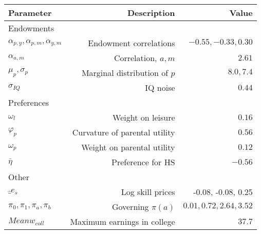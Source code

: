 \begin{tabular}{lrr}
\hline
Parameter & Description  & Value  \\
\hline
Endowments &   &   \\
$\alpha_{p,y}, \alpha_{p,m}, \alpha_{y,m}$ & Endowment correlations  & $-0.55, -0.33, 0.30$  \\
$\alpha_{a,m}$ & Correlation, $a,m$  & $2.61$  \\
$\mu_{p}, \sigma_{p}$ & Marginal distribution of $p$  & $8.0, 7.4$  \\
$\sigma_{IQ}$ & IQ noise  & $0.44$  \\
Preferences &   &   \\
$\omega_{l}$ & Weight on leisure  & $0.16$  \\
$\varphi_{p}$ & Curvature of parental utility  & $0.56$  \\
$\omega_{p}$ & Weight on parental utility  & $0.12$  \\
$\bar{\eta}$ & Preference for HS  & $-0.56$  \\
Other &   &   \\
$\hat_{e}_{s}$ & Log skill prices  & -0.08, -0.08, 0.25  \\
$\pi_{0}, \pi_{1}, \pi_{a}, \pi_{b}$ & Governing $\pi(a)$  & $0.01, 0.72, 2.64, 3.52$  \\
$Mean w_{coll}$ & Maximum earnings in college  & $37.7$  \\
\hline
\end{tabular}%
